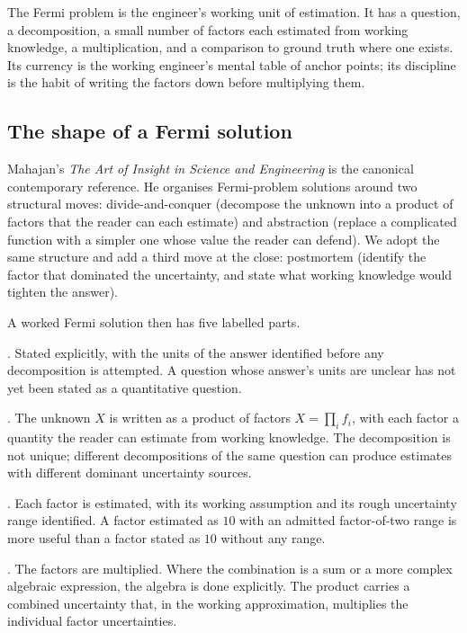 The Fermi problem is the engineer's working unit of estimation. It has
a question, a decomposition, a small number of factors each estimated
from working knowledge, a multiplication, and a comparison to ground
truth where one exists. Its currency is the working engineer's mental
table of anchor points; its discipline is the habit of writing the
factors down before multiplying them.

\subsection{The shape of a Fermi solution}

Mahajan's \emph{The Art of Insight in Science and Engineering}
\cite{text:mahajan2014} is the canonical contemporary reference. He
organises Fermi-problem solutions around two structural moves:
divide-and-conquer (decompose the unknown into a product of factors
that the reader can each estimate) and abstraction (replace a
complicated function with a simpler one whose value the reader can
defend). We adopt the same structure and add a third move at the close:
postmortem (identify the factor that dominated the uncertainty, and
state what working knowledge would tighten the answer).

A worked Fermi solution then has five labelled parts.

. Stated explicitly, with the units of the answer
identified before any decomposition is attempted. A question whose
answer's units are unclear has not yet been stated as a quantitative
question.

. The unknown $X$ is written as a product of
factors $X = \prod_{i} f_{i}$, with each factor a quantity the reader
can estimate from working knowledge. The decomposition is not unique;
different decompositions of the same question can produce estimates
with different dominant uncertainty sources.

. Each factor is estimated, with its
working assumption and its rough uncertainty range identified. A
factor estimated as $10$ with an admitted factor-of-two range is more
useful than a factor stated as $10$ without any range.

. The factors are multiplied. Where the
combination is a sum or a more complex algebraic expression, the
algebra is done explicitly. The product carries a combined uncertainty
that, in the working approximation, multiplies the individual factor
uncertainties.

